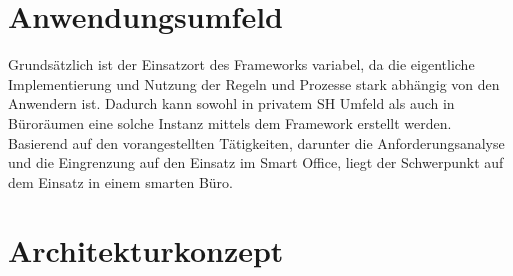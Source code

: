


\section{Anwendungsumfeld}
\label{sec:anwendungsumfeld}
    Grundsätzlich ist der Einsatzort des Frameworks variabel, da die eigentliche Implementierung und Nutzung der Regeln und Prozesse stark 
    abhängig von den Anwendern ist. Dadurch kann sowohl in privatem \acl{SH} Umfeld als auch in Büroräumen eine solche Instanz mittels dem 
    Framework erstellt werden. Basierend auf den vorangestellten Tätigkeiten, darunter die Anforderungsanalyse und die Eingrenzung auf den 
    Einsatz im Smart Office, liegt der Schwerpunkt auf dem Einsatz in einem smarten Büro. 

\section{Architekturkonzept}
\label{sec:architekturkonzept}

